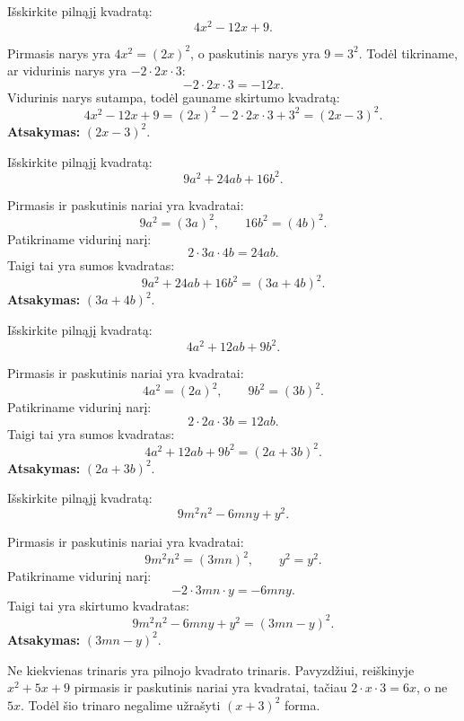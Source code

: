 \documentclass[11pt,a4paper]{scrartcl}
\begin{document}
\begin{example}
Išskirkite pilnąjį kvadratą:
\[
4x^2-12x+9.
\]
\end{example}
\begin{solution}
Pirmasis narys yra $4x^2=(2x)^2$, o paskutinis narys yra $9=3^2$. Todėl tikriname, ar vidurinis narys yra $-2\cdot2x\cdot3$:
\[
-2\cdot2x\cdot3=-12x.
\]
Vidurinis narys sutampa, todėl gauname skirtumo kvadratą:
\[
4x^2-12x+9=(2x)^2-2\cdot2x\cdot3+3^2=(2x-3)^2.
\]
\textbf{Atsakymas:} $(2x-3)^2$.
\end{solution}

\begin{example}
Išskirkite pilnąjį kvadratą:
\[
9a^2+24ab+16b^2.
\]
\end{example}
\begin{solution}
Pirmasis ir paskutinis nariai yra kvadratai:
\[
9a^2=(3a)^2, \qquad 16b^2=(4b)^2.
\]
Patikriname vidurinį narį:
\[
2\cdot3a\cdot4b=24ab.
\]
Taigi tai yra sumos kvadratas:
\[
9a^2+24ab+16b^2=(3a+4b)^2.
\]
\textbf{Atsakymas:} $(3a+4b)^2$.
\end{solution}

\begin{example}
Išskirkite pilnąjį kvadratą:
\[
4a^2+12ab+9b^2.
\]
\end{example}
\begin{solution}
Pirmasis ir paskutinis nariai yra kvadratai:
\[
4a^2=(2a)^2, \qquad 9b^2=(3b)^2.
\]
Patikriname vidurinį narį:
\[
2\cdot2a\cdot3b=12ab.
\]
Taigi tai yra sumos kvadratas:
\[
4a^2+12ab+9b^2=(2a+3b)^2.
\]
\textbf{Atsakymas:} $(2a+3b)^2$.
\end{solution}

\begin{example}
Išskirkite pilnąjį kvadratą:
\[
9m^2n^2-6mny+y^2.
\]
\end{example}
\begin{solution}
Pirmasis ir paskutinis nariai yra kvadratai:
\[
9m^2n^2=(3mn)^2, \qquad y^2=y^2.
\]
Patikriname vidurinį narį:
\[
-2\cdot3mn\cdot y=-6mny.
\]
Taigi tai yra skirtumo kvadratas:
\[
9m^2n^2-6mny+y^2=(3mn-y)^2.
\]
\textbf{Atsakymas:} $(3mn-y)^2$.
\end{solution}

\begin{remark}
Ne kiekvienas trinaris yra pilnojo kvadrato trinaris. Pavyzdžiui, reiškinyje $x^2+5x+9$ pirmasis ir paskutinis nariai yra kvadratai, tačiau $2\cdot x\cdot3=6x$, o ne $5x$. Todėl šio trinaro negalime užrašyti $(x+3)^2$ forma.
\end{remark}
\end{document}
